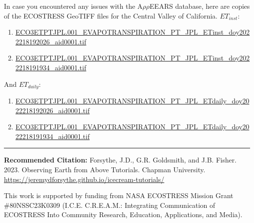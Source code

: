 \documentclass[oneside,a4paper,11pt,explicit]{book}
\begin{document}
\begin{tcolorbox}[colback=yellow!5!white,title=\textbf{Datafiles}]
	\large
	In case you encountered any issues with the A$\rho\rho$EEARS database, here are copies of the ECOSTRESS GeoTIFF files for the Central Valley of California. $ET_{inst}$:
	\begin{enumerate}
		\item \href{https://jeremydforsythe.github.io/icecream-tutorials/Tutorial6_Evaportranspiration1/ECO3ETPTJPL.001_EVAPOTRANSPIRATION_PT_JPL_ETinst_doy2022218192026_aid0001.tif}{\small ECO3ETPTJPL.001\_EVAPOTRANSPIRATION\_PT\_JPL\_ETinst\_doy2022218192026\_aid0001.tif}
		\item \href{https://jeremydforsythe.github.io/icecream-tutorials/Tutorial6_Evaportranspiration1/ECO3ETPTJPL.001_EVAPOTRANSPIRATION_PT_JPL_ETinst_doy2022218191934_aid0001.tif}{\small ECO3ETPTJPL.001\_EVAPOTRANSPIRATION\_PT\_JPL\_ETinst\_doy2022218191934\_aid0001.tif}
	\end{enumerate}
	And $ET_{daily}$:
	\begin{enumerate}
		\item \href{https://jeremydforsythe.github.io/icecream-tutorials/Tutorial6_Evaportranspiration1/ECO3ETPTJPL.001_EVAPOTRANSPIRATION_PT_JPL_ETdaily_doy2022218192026_aid0001.tif}{\small ECO3ETPTJPL.001\_EVAPOTRANSPIRATION\_PT\_JPL\_ETdaily\_doy2022218192026\_aid0001.tif}
		\item \href{https://jeremydforsythe.github.io/icecream-tutorials/Tutorial6_Evaportranspiration1/ECO3ETPTJPL.001_EVAPOTRANSPIRATION_PT_JPL_ETdaily_doy2022218191934_aid0001.tif
}{\small ECO3ETPTJPL.001\_EVAPOTRANSPIRATION\_PT\_JPL\_ETdaily\_doy2022218191934\_aid0001.tif}
	\end{enumerate}
\end{tcolorbox}


\hrule

\vspace{1em}

\small \textbf{Recommended Citation:} Forsythe, J.D., G.R. Goldsmith, and J.B. Fisher. 2023. Observing Earth from Above Tutorials. Chapman University. \url{https://jeremydforsythe.github.io/icecream-tutorials/}

\vspace{1em}

This work is supported by funding from NASA ECOSTRESS Mission Grant \#80NSSC23K0309 (I.C.E. C.R.E.A.M.: Integrating Communication of ECOSTRESS Into Community Research, Education, Applications, and Media).
\end{document}
